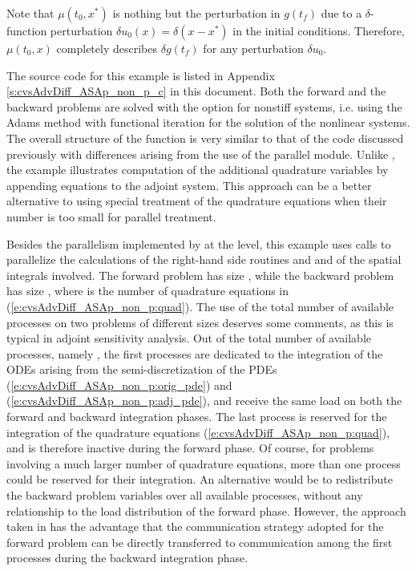 Note that $\mu(t_0 , x^*)$ is nothing but the perturbation in $g(t_f)$
due to a $\delta$-function perturbation $\delta u_0(x) = \delta(x-x^*)$ in the
initial conditions.  Therefore, $\mu(t_0,x)$ completely describes $\delta g(t_f)$
for any perturbation $\delta u_0$.

The source code for this example is listed in Appendix
\ref{s:cvsAdvDiff_ASAp_non_p_c} in this document.  Both the forward
and the backward problems are solved with the option for nonstiff systems,
i.e. using the Adams method with functional iteration for the solution of
the nonlinear systems. The overall structure of the  function is very
similar to that of the code  discussed previously with 
differences arising from the use of the parallel {\nvector} module. Unlike 
, the example  illustrates
computation of the additional quadrature variables by appending  equations
to the adjoint system.  This approach can be a better alternative to using special
treatment of the quadrature equations when their number is too small for parallel
treatment.

Besides the parallelism implemented by {\cvodes} at the {\nvector} level,
this example uses {\mpi} calls to parallelize the calculations of the
right-hand side routines  and  and of the spatial integrals involved.
The forward problem has size , while the backward problem has
size , where  is the number of quadrature equations
in (\ref{e:cvsAdvDiff_ASAp_non_p:quad}).
The use of the total number of available processes on two problems of different 
sizes deserves some comments, as this is typical in adjoint sensitivity 
analysis. Out of the total number of available processes, namely ,
the first  processes are dedicated to the integration of
the ODEs arising from the semi-discretization of the PDEs 
(\ref{e:cvsAdvDiff_ASAp_non_p:orig_pde}) and (\ref{e:cvsAdvDiff_ASAp_non_p:adj_pde}),
and receive the same load on both the forward and backward integration phases. 
The last process is reserved for the integration of the quadrature equations 
(\ref{e:cvsAdvDiff_ASAp_non_p:quad}), and is therefore inactive during the forward 
phase. Of course, for problems involving a much larger number of quadrature equations,
more than one process could be reserved for their integration. 
An alternative would be to redistribute the  backward problem variables 
over all available processes, without any relationship to the load distribution 
of the forward phase. However, the approach taken in 
has the advantage that the communication strategy adopted for the forward problem 
can be directly transferred to communication among the first 
processes during the backward integration phase. 

